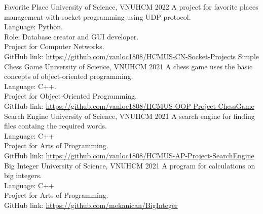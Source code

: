 \documentclass[11pt]{spidercv}
\begin{document}
    





    \begin{MainPart}

    \Experience
        {\ColorHighlight}
		{Favorite Place}
		{University of Science, VNUHCM}
        {2022}
        {   
            A project for favorite places management with socket programming using UDP protocol. \\
            Language: Python.\\
            Role: Database creator and GUI developer.\\
            Project for Computer Networks.\\
            GitHub link: \url{https://github.com/vanloc1808/HCMUS-CN-Socket-Projects}
        }
    \Experience
        {\ColorHighlight}
		{Simple Chess Game}
		{University of Science, VNUHCM}
        {2021}
        {   
            A chess game uses the basic concepts of object-oriented programming.\\
            Language: C++.\\
            Project for Object-Oriented Programming.\\
            GitHub link: \url{https://github.com/vanloc1808/HCMUS-OOP-Project-ChessGame}
        }
    \Experience
        {\ColorHighlight}
		{Search Engine}
		{University of Science, VNUHCM}
        {2021}
        {   
            A search engine for finding files containg the required words.\\
            Language: C++\\
            Project for Arts of Programming.\\
            GitHub link:
            \url{https://github.com/vanloc1808/HCMUS-AP-Project-SearchEngine}
        }
    \Experience
        {\ColorHighlight}
		{Big Integer}
		{University of Science, VNUHCM}
        {2021}
        {   
            A program for calculations on big integers.\\
            Language: C++\\
            Project for Arts of Programming.\\
            GitHub link: 
            \url{https://github.com/mekanican/BigInteger}
        }



\end{MainPart}
\end{document}
